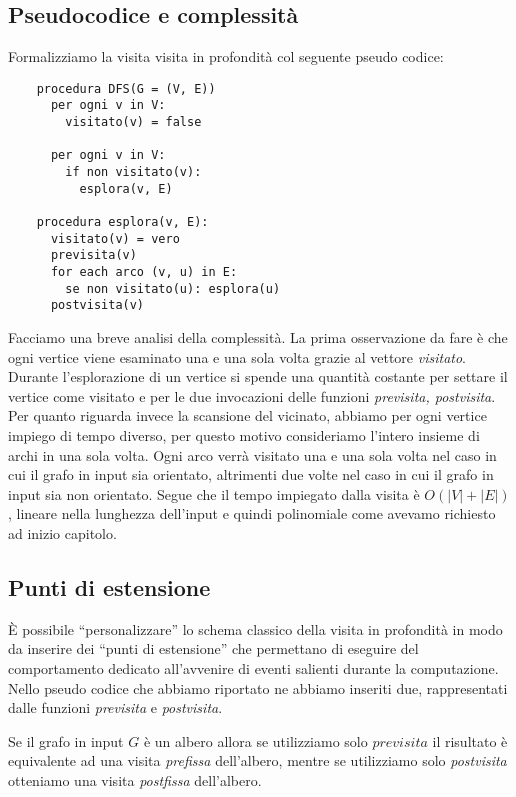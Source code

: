 \subsection{Pseudocodice e complessit\`a}
Formalizziamo la visita visita in profondit\`a col seguente pseudo
codice:
\begin{lstlisting}
    procedura DFS(G = (V, E))
      per ogni v in V:
        visitato(v) = false

      per ogni v in V:
        if non visitato(v):
          esplora(v, E)

    procedura esplora(v, E):
      visitato(v) = vero
      previsita(v)
      for each arco (v, u) in E:
        se non visitato(u): esplora(u)
      postvisita(v)
\end{lstlisting}

Facciamo una breve analisi della complessit\`a. La prima osservazione
da fare \`e che ogni vertice viene esaminato una e una sola volta
grazie al vettore \emph{visitato}. Durante l'esplorazione di un
vertice si spende una quantit\`a costante per settare il vertice come
visitato e per le due invocazioni delle funzioni \emph{previsita,
  postvisita}. Per quanto riguarda invece la scansione del vicinato,
abbiamo per ogni vertice impiego di tempo diverso, per questo motivo
consideriamo l'intero insieme di archi in una sola volta. Ogni arco
verr\`a visitato una e una sola volta nel caso in cui il grafo in
input sia orientato, altrimenti due volte nel caso in cui il grafo in
input sia non orientato. Segue che il tempo impiegato dalla visita \`e
$O(|V| + |E|)$, lineare nella lunghezza dell'input e quindi
polinomiale come avevamo richiesto ad inizio capitolo.

\subsection{Punti di estensione}
\`E possibile ``personalizzare'' lo schema classico della visita in
profondit\`a in modo da inserire dei ``punti di estensione'' che
permettano di eseguire del comportamento dedicato all'avvenire di
eventi salienti durante la computazione. Nello pseudo codice che
abbiamo riportato ne abbiamo inseriti due, rappresentati dalle
funzioni \emph{previsita} e \emph{postvisita}.

Se il grafo in input $G$ \`e un albero allora se utilizziamo solo
$previsita$ il risultato \`e equivalente ad una visita \emph{prefissa}
dell'albero, mentre se utilizziamo solo \emph{postvisita} otteniamo una
visita \emph{postfissa} dell'albero.

